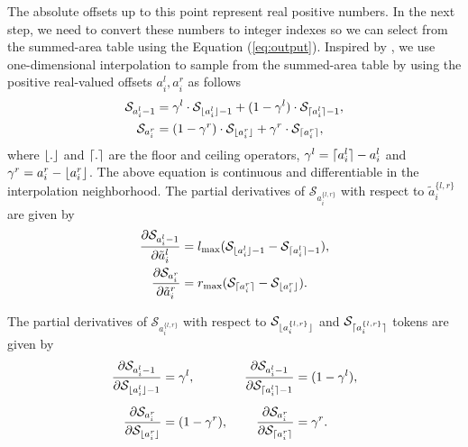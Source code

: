 \documentclass{article}
\begin{document}
The absolute offsets up to this point represent real positive numbers. In the next step, we need to convert these numbers to integer indexes so we can select from the summed-area table using the Equation (\ref{eq:output}). Inspired by \citet{zhang2019accelerating}, we use one-dimensional interpolation to sample from the summed-area table 
by
using the  positive real-valued offsets $a_i^l, a_i^r$ as follows
\begin{align}
\begin{split}
    \mathcal{S}_{a_{i}^l-1} &= 
    \gamma^l \cdot \mathcal{S}_{\lfloor a_{i}^l \rfloor-1} + 
    (1-\gamma^l) \cdot \mathcal{S}_{\lceil a_{i}^l \rceil-1}, \\
    \mathcal{S}_{a_{i}^r} &= 
    (1-\gamma^r) \cdot \mathcal{S}_{\lfloor a_{i}^r \rfloor} + 
    \gamma^r  \cdot \mathcal{S}_{\lceil a_{i}^r \rceil},
\end{split}
\label{eq:off_use}
\end{align}
where $\lfloor . \rfloor$ and $\lceil . \rceil$ are the floor and ceiling operators, $\gamma^l = \lceil a_{i}^l \rceil - a_{i}^l$ and $\gamma^r = a_{i}^r - \lfloor a_{i}^r \rfloor$. The above equation is continuous and differentiable in the interpolation neighborhood. The partial derivatives of $\mathcal{S}_{a_{i}^{\{l,r\}}}$ with respect to $\tilde{a}_{i}^{\{l,r\}}$ are given by
\begin{align}
\begin{split}
    \frac{\partial \mathcal{S}_{a_{i}^l-1}}{\partial \tilde{a}_{i}^l} &=  l_\text{max} ( \mathcal{S}_{\lfloor a_{i}^l \rfloor-1} - \mathcal{S}_{\lceil a_{i}^l \rceil-1}), \\
    \frac{\partial \mathcal{S}_{a_{i}^r}}{\partial \tilde{a}_{i}^r} &=  r_\text{max} ( \mathcal{S}_{\lceil a_{i}^r \rceil} - \mathcal{S}_{\lfloor a_{i}^r \rfloor}).
\end{split}
\end{align}

The partial derivatives of $\mathcal{S}_{a_{i}^{\{l,r\}}}$ with respect to $\mathcal{S}_{\lfloor a_{i}^{\{l,r\}} \rfloor}$ and $\mathcal{S}_{\lceil a_{i}^{\{l,r\}} \rceil}$ tokens are given by
\begin{equation}
\begin{aligned}
\frac{\partial \mathcal{S}_{a_{i}^l-1}}{\partial \mathcal{S}_{\lfloor a_{i}^l \rfloor-1}} &= \gamma^l, \:&\:
\frac{\partial \mathcal{S}_{a_{i}^l-1}}{\partial \mathcal{S}_{\lceil a_{i}^l \rceil-1}} &= (1-\gamma^l), \\[5pt]
\frac{\partial \mathcal{S}_{a_{i}^r}}{\partial \mathcal{S}_{\lfloor a_{i}^r \rfloor}} &= (1-\gamma^r), \:&\:
\frac{\partial \mathcal{S}_{a_{i}^r}}{\partial \mathcal{S}_{\lceil a_{i}^r \rceil}} &= \gamma^r.
\end{aligned}
\end{equation}
\end{document}
